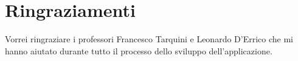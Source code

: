 \chapter*{Ringraziamenti}
Vorrei ringraziare i professori Francesco Tarquini e Leonardo D'Errico che mi hanno aiutato durante tutto il processo dello sviluppo dell'applicazione. 